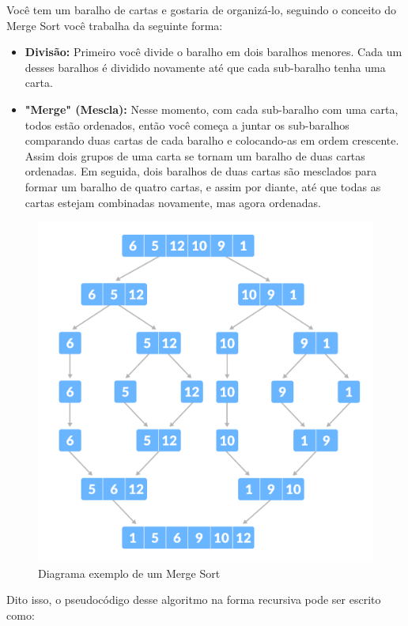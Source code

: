 Você tem um baralho de cartas e gostaria de organizá-lo, seguindo o conceito do Merge Sort você trabalha da seguinte forma:
\begin{itemize}
  \item \textbf{Divisão:} Primeiro você divide o baralho em dois baralhos menores. Cada um desses baralhos é dividido novamente até que cada sub-baralho tenha uma carta.
  \item \textbf{"Merge" (Mescla):} Nesse momento, com cada sub-baralho com uma carta, todos estão ordenados, então você começa a juntar os sub-baralhos comparando duas cartas de cada baralho e colocando-as em ordem crescente. Assim dois grupos de uma carta se tornam um baralho de duas cartas ordenadas. Em seguida, dois baralhos de duas cartas são mesclados para formar um baralho de quatro cartas, e assim por diante, até que todas as cartas estejam combinadas novamente, mas agora ordenadas.
\end{itemize}
\begin{figure}[!ht]
    \centering
    \includegraphics[scale=0.3]{figures/merge-sort-example_0.png}
    \caption{Diagrama exemplo de um Merge Sort}
    \label{fig:merge_sort_example_0}
\end{figure}

\noindent
Dito isso, o pseudocódigo desse algoritmo na forma recursiva pode ser escrito como:

